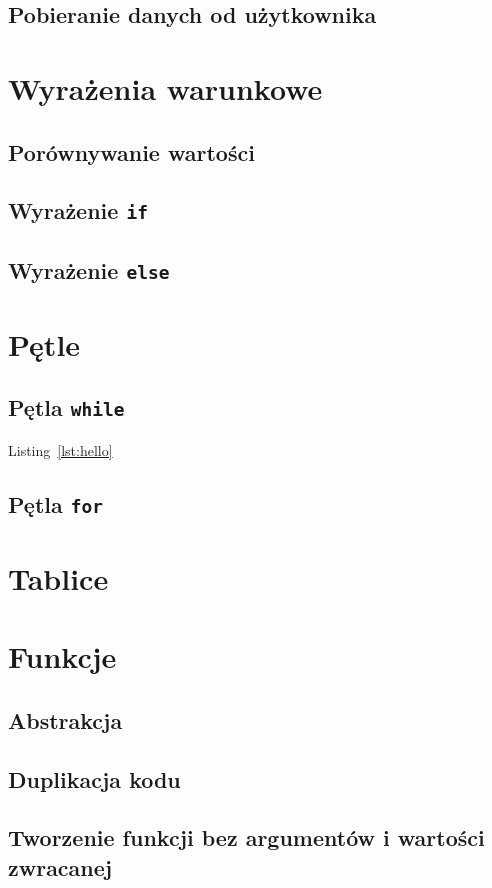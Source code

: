 \documentclass[11pt]{book}
\begin{document}
\section{Pobieranie danych od użytkownika}

\chapter{Wyrażenia warunkowe}
\section{Porównywanie wartości}
\section{Wyrażenie \texttt{if}}
\section{Wyrażenie \texttt{else}}

\chapter{Pętle}
\section{Pętla \texttt{while}}
Listing~\ref{lst:hello}
\section{Pętla \texttt{for}}

\chapter{Tablice}

\chapter{Funkcje}
\section{Abstrakcja}
\section{Duplikacja kodu}
\section{Tworzenie funkcji bez argumentów i wartości zwracanej}
\end{document}
